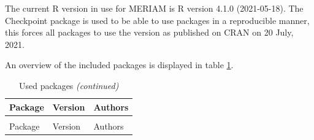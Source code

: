 \documentclass[
]{article}
\begin{document}
The current R version in use for MERIAM is R version 4.1.0 (2021-05-18). The Checkpoint package is used to be able to use packages in a reproducible manner, this forces all packages to use the version as published on CRAN on 20 July, 2021.

An overview of the included packages is displayed in table \ref{tab:r-packages}.

\begin{landscape}\begingroup\fontsize{7}{9}\selectfont

\begin{longtable}[t]{lll}
\caption{\label{tab:r-packages}Used packages}\\
\toprule
Package & Version & Authors\\
\midrule
\endfirsthead
\caption[]{\label{tab:r-packages}Used packages \textit{(continued)}}\\
\toprule
Package & Version & Authors\\
\midrule
\endhead


\end{longtable}
\end{landscape}
\end{document}
